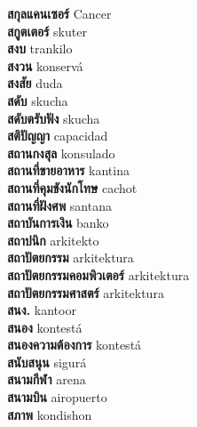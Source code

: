 \textbf{ สกุลแคนเซอร์  } Cancer \\
\textbf{ สกูตเตอร์  } skuter \\
\textbf{ สงบ  } trankilo \\
\textbf{ สงวน  } konservá \\
\textbf{ สงสัย  } duda \\
\textbf{ สดับ  } skucha \\
\textbf{ สดับตรับฟัง  } skucha \\
\textbf{ สติปัญญา  } capacidad \\
\textbf{ สถานกงสุล  } konsulado \\
\textbf{ สถานที่ขายอาหาร  } kantina \\
\textbf{ สถานที่คุมขังนักโทษ  } cachot \\
\textbf{ สถานที่ฝังศพ  } santana \\
\textbf{ สถาบันการเงิน  } banko \\
\textbf{ สถาปนิก  } arkitekto \\
\textbf{ สถาปัตยกรรม  } arkitektura \\
\textbf{ สถาปัตยกรรมคอมพิวเตอร์  } arkitektura \\
\textbf{ สถาปัตยกรรมศาสตร์  } arkitektura \\
\textbf{ สนง.  } kantoor \\
\textbf{ สนอง  } kontestá \\
\textbf{ สนองความต้องการ  } kontestá \\
\textbf{ สนับสนุน  } sigurá \\
\textbf{ สนามกีฬา  } arena \\
\textbf{ สนามบิน  } airopuerto \\
\textbf{ สภาพ  } kondishon \\
